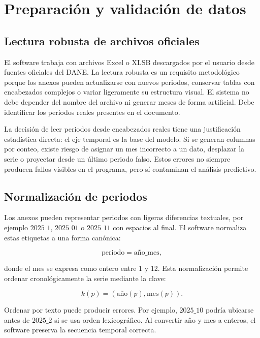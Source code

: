 \section{Preparación y validación de datos}

\subsection{Lectura robusta de archivos oficiales}

El software trabaja con archivos Excel o XLSB descargados por el usuario desde fuentes oficiales del DANE. La lectura robusta es un requisito metodológico porque los anexos pueden actualizarse con nuevos periodos, conservar tablas con encabezados complejos o variar ligeramente su estructura visual. El sistema no debe depender del nombre del archivo ni generar meses de forma artificial. Debe identificar los periodos reales presentes en el documento.

La decisión de leer periodos desde encabezados reales tiene una justificación estadística directa: el eje temporal es la base del modelo. Si se generan columnas por conteo, existe riesgo de asignar un mes incorrecto a un dato, desplazar la serie o proyectar desde un último periodo falso. Estos errores no siempre producen fallos visibles en el programa, pero sí contaminan el análisis predictivo.

\subsection{Normalización de periodos}

Los anexos pueden representar periodos con ligeras diferencias textuales, por ejemplo \(2025\_1\), \(2025\_01\) o \(2025\_11\) con espacios al final. El software normaliza estas etiquetas a una forma canónica:

\begin{equation}
    \text{periodo} = \text{año}\_\text{mes},
    \label{eq:periodo_canonico}
\end{equation}

donde el mes se expresa como entero entre 1 y 12. Esta normalización permite ordenar cronológicamente la serie mediante la clave:

\begin{equation}
    k(p) = \left(\text{año}(p), \text{mes}(p)\right).
    \label{eq:period_key}
\end{equation}

Ordenar por texto puede producir errores. Por ejemplo, \(2025\_10\) podría ubicarse antes de \(2025\_2\) si se usa orden lexicográfico. Al convertir año y mes a enteros, el software preserva la secuencia temporal correcta.


